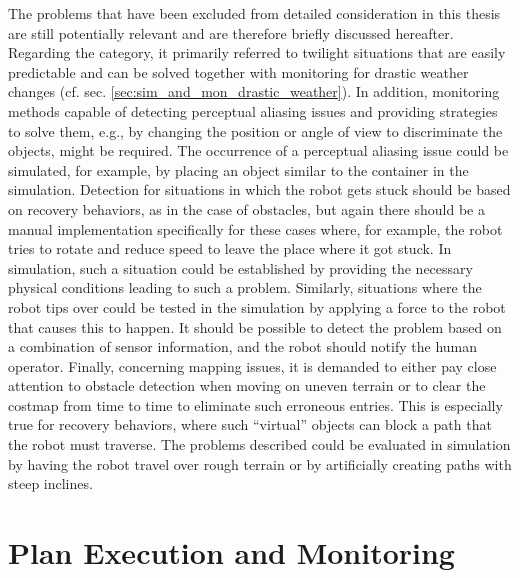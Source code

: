 \documentclass[english, master, utf8]{base/thesis_KBS}
\newcommand{\code}{\collectverb{\codebox}}
\begin{document}
The problems that have been excluded from detailed consideration in this thesis are still potentially relevant and are therefore briefly discussed hereafter. Regarding the
 category, it primarily referred to twilight situations that are easily predictable and can be solved together with monitoring for drastic weather
changes (cf. sec. \ref{sec:sim_and_mon_drastic_weather}). In addition, monitoring methods capable of detecting perceptual aliasing issues and providing strategies to solve them,
e.g., by changing the position or angle of view to discriminate the objects, might be required. The occurrence of a perceptual aliasing issue could be simulated, for example, by
placing an object similar to the container in the simulation. Detection for situations in which the robot gets stuck should be based on \code{move_base_flex} recovery behaviors,
as in the case of obstacles, but again there should be a manual implementation specifically for these cases where, for example, the robot tries to rotate and reduce speed to leave
the place where it got stuck. In simulation, such a situation could be established by providing the necessary physical conditions leading to such a problem. Similarly, situations
where the robot tips over could be tested in the simulation by applying a force to the robot that causes this to happen. It should be possible to detect the problem based on a
combination of sensor information, and the robot should notify the human operator. Finally, concerning mapping issues, it is demanded to either pay close attention to obstacle
detection when moving on uneven terrain or to clear the costmap from time to time to eliminate such erroneous entries. This is especially true for recovery behaviors,  where such
``virtual'' objects can block a path that the robot must traverse. The problems described could be evaluated in simulation by having the robot travel over rough terrain or by
artificially creating paths with steep inclines.

\chapter{Plan Execution and Monitoring}
\label{sec:plan_execution_and_monitoring}
\end{document}
